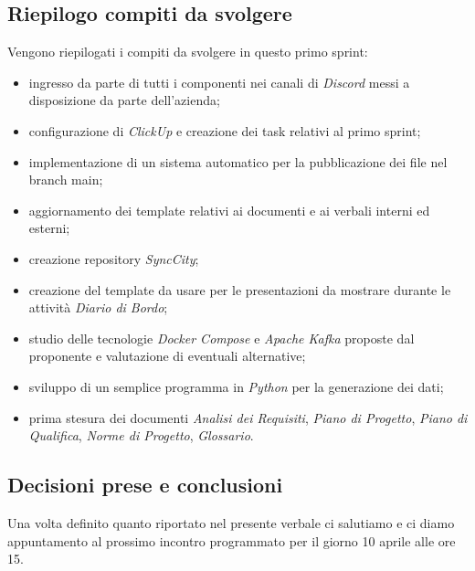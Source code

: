 \documentclass[italian,12pt]{article}
\begin{document}
\subsection{Riepilogo compiti da svolgere}
Vengono riepilogati i compiti da svolgere in questo primo sprint:
\begin{itemize}
	\item ingresso da parte di tutti i componenti nei canali di \textit{Discord} messi a disposizione da parte dell'azienda;
	\item configurazione di \textit{ClickUp} e creazione dei task relativi al primo sprint;
	\item implementazione di un sistema automatico per la pubblicazione dei file nel branch main;
	\item aggiornamento dei template relativi ai documenti e ai verbali interni ed esterni;
	\item creazione repository \textit{SyncCity};
	\item creazione del template da usare per le presentazioni da mostrare durante le attività \textit{Diario di Bordo};
	\item studio delle tecnologie \textit{Docker Compose} e \textit{Apache Kafka} proposte dal proponente e valutazione di eventuali alternative;
	\item sviluppo di un semplice programma in \textit{Python} per la generazione dei dati;
	\item prima stesura dei documenti \textit{Analisi dei Requisiti}, \textit{Piano di Progetto}, \textit{Piano di Qualifica}, \textit{Norme di Progetto}, \textit{Glossario}.
\end{itemize}

\subsection{Decisioni prese e conclusioni}
Una volta definito quanto riportato nel presente verbale ci salutiamo e ci diamo appuntamento al prossimo incontro programmato 
per il giorno 10 aprile alle ore 15.
\end{document}
